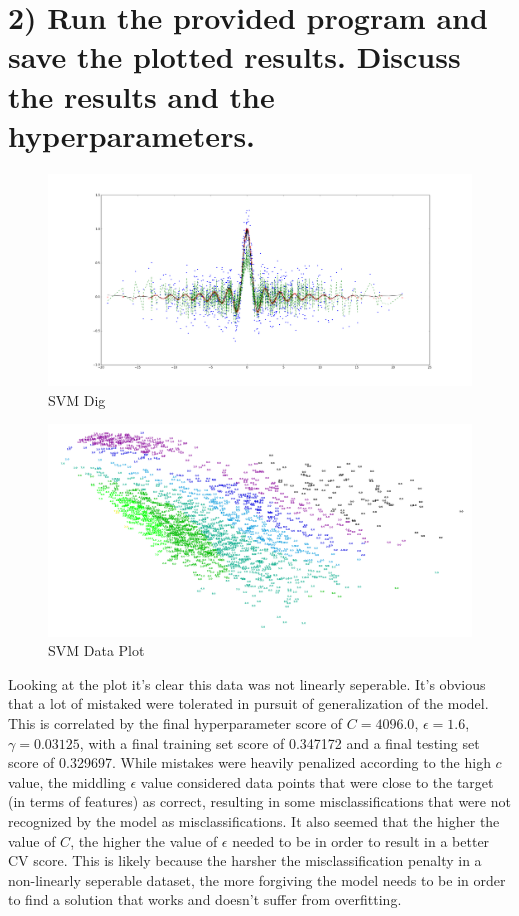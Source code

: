 \documentclass[12pt]{article}
\begin{document}
\section*{2) Run the provided program and save the plotted results. Discuss the results and the hyperparameters.}

\begin{figure}[H]
\raggedright
\includegraphics[width=1\textwidth]{SVMdig.png}
\caption{SVM Dig}
\end{figure}

\begin{figure}[H]
\raggedright
\includegraphics[width=1\textwidth]{SVMdigSpread.png}
\caption{SVM Data Plot}
\end{figure}

Looking at the plot it's clear this data was not linearly seperable. It's obvious that a lot of mistaked were tolerated in pursuit of generalization of the model. This is correlated by the final hyperparameter score of $\textit{C} = 4096.0$, $\epsilon = 1.6$, $\gamma = 0.03125$, with a final training set score of 0.347172 and a final testing set score of 0.329697. While mistakes were heavily penalized according to the high $\textit{c}$ value, the middling $\epsilon$ value considered data points that were close to the target (in terms of features) as correct, resulting in some misclassifications that were not recognized by the model as misclassifications. It also seemed that the higher the value of $\textit{C}$, the higher the value of $\epsilon$ needed to be in order to result in a better CV score. This is likely because the harsher the misclassification penalty in a non-linearly seperable dataset, the more forgiving the model needs to be in order to find a solution that works and doesn't suffer from overfitting.
\end{document}
